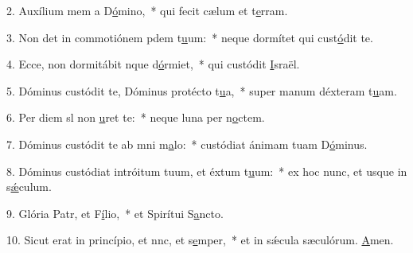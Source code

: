 2. Auxílium mem a D\uline{ó}mino,~* qui fecit cælum et t\uline{e}rram.\par 
3. Non det in commotiónem pdem t\uline{u}um:~* neque dormítet qui cust\uline{ó}dit te.\par 
4. Ecce, non dormitábit nque d\uline{ó}rmiet,~* qui custódit \uline{I}sraël.\par 
5. Dóminus custódit te, Dóminus protécto t\uline{u}a,~* super manum déxteram t\uline{u}am.\par 
6. Per diem sl non \uline{u}ret te:~* neque luna per n\uline{o}ctem.\par 
7. Dóminus custódit te ab mni m\uline{a}lo:~* custódiat ánimam tuam D\uline{ó}minus.\par 
8. Dóminus custódiat intróitum tuum, et éxtum t\uline{u}um:~* ex hoc nunc, et usque in s\uline{ǽ}culum.\par 
9. Glória Patr, et F\uline{í}lio,~* et Spirítui S\uline{a}ncto.\par 
10. Sicut erat in princípio, et nnc, et s\uline{e}mper,~* et in sǽcula sæculórum. \uline{A}men.\par 
